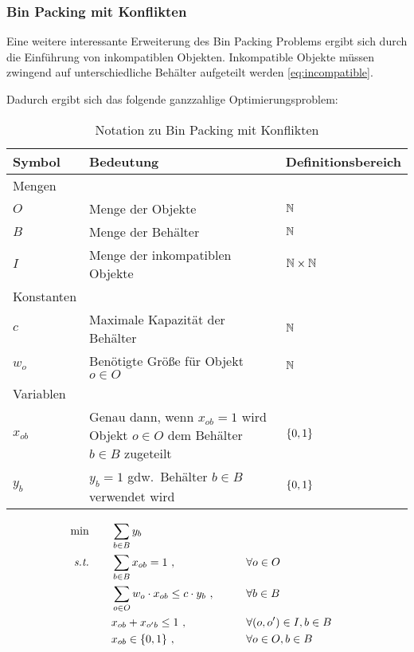 \subsubsection{Bin Packing mit Konflikten}\label{subsubsec:bin-packing-with-conflicts}

Eine weitere interessante Erweiterung des Bin Packing Problems ergibt sich durch die Einführung
von inkompatiblen Objekten.
Inkompatible Objekte müssen zwingend auf unterschiedliche Behälter aufgeteilt werden \eqref{eq:incompatible}.

Dadurch ergibt sich das folgende ganzzahlige Optimierungsproblem:
\begin{table}[H]
    \begin{tabularx}{\textwidth}{  l | X | l }
    Symbol & Bedeutung & Definitionsbereich \\\hline\hline
    Mengen & & \\\hline\hline
    $O$ & Menge der Objekte & $\mathbb{N}$\\\hline
    $B$ & Menge der Behälter & $\mathbb{N}$\\\hline
    $I$ & Menge der inkompatiblen Objekte & $\mathbb{N}\times\mathbb{N}$\\\hline\hline
    Konstanten &  &  \\\hline\hline
    $c$ & Maximale Kapazität der Behälter & $\mathbb{N}$\\\hline
    $w_o$ & Benötigte Größe für Objekt $o\in O$ & $\mathbb{N}$\\\hline\hline
    Variablen &  &  \\\hline\hline
    $x_{ob}$ & Genau dann, wenn $x_{ob}=1$ wird Objekt $o\in O$ dem Behälter $b\in B$ zugeteilt & $\{0,1\}$\\\hline
    $y_b$ & $y_b=1$ gdw.\ Behälter $b\in B$ verwendet wird & $\{0,1\}$\\\hline
    \end{tabularx}
    \caption{Notation zu Bin Packing mit Konflikten}\label{tab:notation_bin_packing_conflicts}
\end{table}

\begin{align}
    \min \qquad& \sum_{b\in B} y_b \\
    \textit{s.t.} \qquad
    & \sum_{b\in B} x_{ob} = 1~, \qquad &&\forall o\in O  \\
    & \sum_{o\in O} w_{o} \cdot x_{ob} \leq c \cdot y_b~, \qquad &&\forall b\in B \\
    & x_{ob} + x_{o'b} \leq 1~, \qquad &&\forall (o,o')\in I, b\in B\label{eq:incompatible}\\
    & x_{ob} \in \{0,1\}~, \qquad &&\forall o\in O, b\in B
\end{align}
